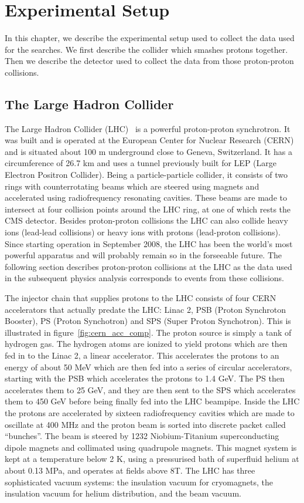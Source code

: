 \chapter{Experimental Setup}
\label{chap:exper_setup}
In this chapter, we describe the experimental setup used to collect the data used for the searches. We first describe the collider which smashes protons together. Then we describe the detector used to collect the data from those proton-proton collisions.
\section{The Large Hadron Collider}
\label{sec:LHC}

The Large Hadron Collider (LHC)~\cite{lhcmachine} is a powerful proton-proton synchrotron. It was built and is operated at the European Center for Nuclear Research (CERN) and is situated about 100 m underground close to Geneva, Switzerland. It has a circumference of 26.7 km and uses a tunnel previously built for LEP (Large Electron Positron Collider). Being a particle-particle collider, it consists of two rings with counterrotating beams which are steered using magnets and accelerated using radiofrequency resonating cavities. These beams are made to intersect at four collision points around the LHC ring, at one of which rests the CMS detector. Besides proton-proton collisions the LHC can also collide heavy ions (lead-lead collisions) or heavy ions with protons (lead-proton collisions). Since starting operation in September 2008, the LHC has been the world's most powerful apparatus and will probably remain so in the forseeable future. The following section describes proton-proton collisions at the LHC as the data used in the subsequent physics analysis corresponds to events from these collisions.

The injector chain that supplies protons to the LHC consists of four CERN accelerators that actually predate the LHC: Linac 2, PSB (Proton Synchroton Booster), PS (Proton Synchotron) and SPS (Super Proton Synchotron). This is illustrated in figure~\ref{fig:cern_acc_comp}. The proton source is simply a tank of hydrogen gas. The hydrogen atoms are ionized to yield protons which are then fed in to the Linac 2, a linear accelerator. This accelerates the protons to an energy of about 50 MeV which are then fed into a series of circular accelerators, starting with the PSB which accelerates the protons to 1.4 GeV. The PS then accelerates them to 25 GeV, and they are then sent to the SPS which accelerates them to 450 GeV before being finally fed into the LHC beampipe. Inside the LHC the protons are accelerated by sixteen radiofrequency cavities which are made to oscillate at 400 MHz and the proton beam is sorted into discrete packet called ``bunches''. The beam is steered by 1232 Niobium-Titanium superconducting dipole magnets and collimated using quadrupole magnets. This magnet system is kept at a temperature below 2 K, using a pressurised bath of superfluid helium at about 0.13 MPa, and operates at fields above 8T. The LHC has three sophisticated vacuum systems: the insulation vacuum for cryomagnets, the insulation vacuum for helium distribution, and the beam vacuum.

